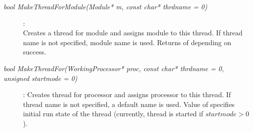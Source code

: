 \begin{description}

\item[\em bool MakeThreadForModule\small (Module* m, const char* thrdname = 0) ] :
 \\
Creates a thread for module  and assigns module to this thread.
If thread name  is not specified, module name is used.
Returns  of  
 depending on success.
	   

\item[\em bool MakeThreadFor\small (WorkingProcessor* proc, const char* thrdname = 0, unsigned startmode = 0) ] :
Creates thread for processor  and assigns processor to this thread.
If thread name  is not specified, a default name is used.
Value of  specifies initial run state of the thread
(currently, thread is started if $startmode>0$).


        

	   
\end{description}
	 
